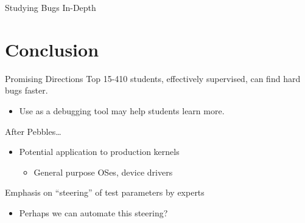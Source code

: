 \documentclass[xcolor=dvipsnames]{beamer}
\begin{document}
\begin{frame}{Studying Bugs In-Depth} %
\end{frame}

\section{Conclusion}

%
%
%

\begin{frame}{Promising Directions}
	Top 15-410 students, effectively supervised, can find hard bugs faster.
	\begin{itemize}
		\item Use as a debugging tool may help students learn more.
	\end{itemize}
	\linegap

	After Pebbles\dots
	\begin{itemize}
		\item Potential application to production kernels
		\begin{itemize}
			\item General purpose OSes, device drivers
		\end{itemize}
	\end{itemize}
	\linegap

	Emphasis on ``steering'' of test parameters by experts
	\begin{itemize}
		\item Perhaps we can automate this steering?
	\end{itemize}
	\linegap
\end{frame}
\end{document}
